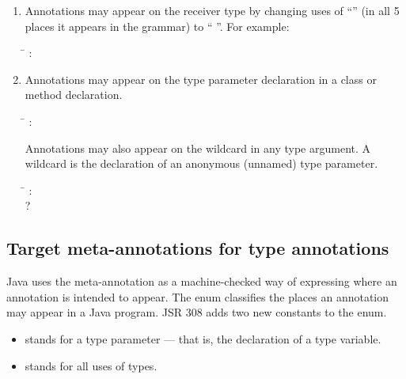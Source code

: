 \documentclass[10pt]{article}
\begin{document}
\begin{enumerate}
\item
Annotations may appear on the receiver type by changing uses of
``'' (in
all 5 places it appears in the grammar)
to `` ''.  For example:

\begin{tabbing}
\qquad \= \kill
{}: \\
\qquad            {}   \nt{(}  \altor{} \term{;} \nt{)}
\end{tabbing}


\item
Annotations may appear on the type parameter declaration in a class or method
declaration.

\begin{tabbing}
\qquad \= \kill
{}: \\
\qquad            {}  
\end{tabbing}

Annotations may also appear on the wildcard in any type argument.
A wildcard is the declaration of an anonymous (unnamed) type parameter.

\begin{tabbing}
\qquad \= \kill
{}: \\
\qquad            {} ?\ 
\end{tabbing}


\end{enumerate}



\subsection{Target meta-annotations for type annotations\label{target-meta-annotation}}

Java uses the  meta-annotation as a machine-checked way of
expressing where an annotation is intended to appear.  The
 enum classifies the places an annotation may appear in a
Java program.  JSR 308 adds two new constants to the 
enum.

\begin{itemize}
\item
{} stands for a type parameter --- that is,
the declaration of a type variable.
\item
{} stands for all uses of types.
\end{itemize}
\end{document}
